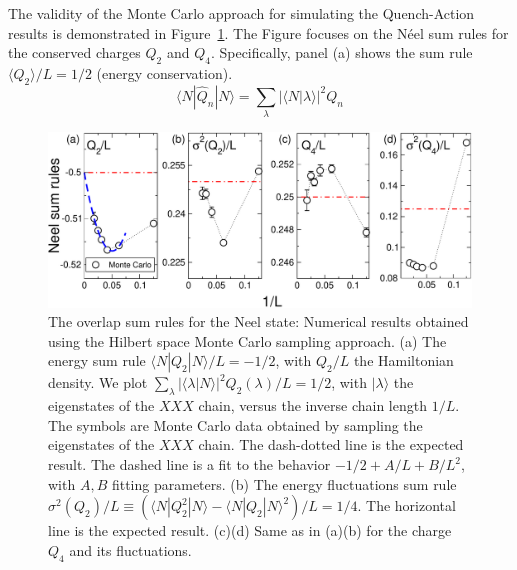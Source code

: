 \documentclass[11pt]{iopart}
\begin{document}
The validity of the Monte Carlo approach for simulating the Quench-Action results 
is demonstrated in Figure~\ref{fig5-neel-sum-rules}. The Figure focuses on the 
N\'eel sum rules for the conserved charges $Q_2$ and $Q_4$. Specifically, 
panel (a) shows the sum rule $\langle Q_2\rangle/L=1/2$ (energy conservation). 
%
\begin{equation}
\langle N|\hat Q_n|N\rangle=\sum\limits_{\lambda}|\langle N|\lambda\rangle|^2
Q_n
\end{equation}
%



\begin{figure}[t]
\begin{center}
\includegraphics[width=.9\textwidth]{./draft_figs/QAMC_Obs_Neel}
\end{center}
\caption{The overlap sum rules for the Neel state: Numerical results 
 obtained using the Hilbert space Monte Carlo sampling approach. (a) 
 The energy sum rule $\langle N|Q_2|N\rangle/L=-1/2$, with $Q_2/L$ 
 the Hamiltonian density. We plot $\sum_{\lambda}|\langle\lambda|
 N\rangle|^2Q_2(\lambda)/L=1/2$, with $|\lambda\rangle$ the 
 eigenstates of the $XXX$ chain, versus the inverse chain length $1/L$. 
 The symbols are Monte Carlo data obtained by sampling the eigenstates 
 of the $XXX$ chain. The dash-dotted line is the expected result. The 
 dashed line is a fit to the behavior $-1/2+A/L+B/L^2$, with $A,B$ 
 fitting parameters. (b) The energy fluctuations sum rule $\sigma^2(Q_2)/
 L\equiv(\langle N|Q_2^2|N\rangle-\langle N|Q_2|N\rangle^2)/L=1/4$. The 
 horizontal line is the expected result. (c)(d) Same as in (a)(b) for 
 the charge $Q_4$ and its fluctuations. 
}
\label{fig5-neel-sum-rules}
\end{figure}
\end{document}
